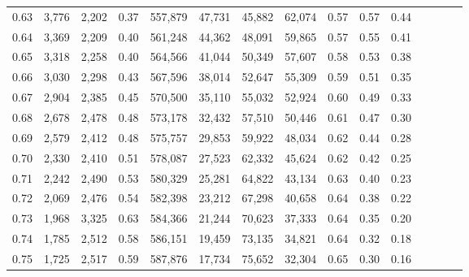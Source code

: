 \begin{tabular}{rrrcrrrrrrrrrrr}
0.63 &   3,776 &  2,202 &                                       0.37 &  557,879 &   47,731 &   45,882 &   62,074 &  0.57 &  0.57 &                         0.44 \\
0.64 &   3,369 &  2,209 &                                       0.40 &  561,248 &   44,362 &   48,091 &   59,865 &  0.57 &  0.55 &                         0.41 \\
0.65 &   3,318 &  2,258 &                                       0.40 &  564,566 &   41,044 &   50,349 &   57,607 &  0.58 &  0.53 &                         0.38 \\
0.66 &   3,030 &  2,298 &                                       0.43 &  567,596 &   38,014 &   52,647 &   55,309 &  0.59 &  0.51 &                         0.35 \\
0.67 &   2,904 &  2,385 &                                       0.45 &  570,500 &   35,110 &   55,032 &   52,924 &  0.60 &  0.49 &                         0.33 \\
0.68 &   2,678 &  2,478 &                                       0.48 &  573,178 &   32,432 &   57,510 &   50,446 &  0.61 &  0.47 &                         0.30 \\
0.69 &   2,579 &  2,412 &                                       0.48 &  575,757 &   29,853 &   59,922 &   48,034 &  0.62 &  0.44 &                         0.28 \\
0.70 &   2,330 &  2,410 &                                       0.51 &  578,087 &   27,523 &   62,332 &   45,624 &  0.62 &  0.42 &                         0.25 \\
0.71 &   2,242 &  2,490 &                                       0.53 &  580,329 &   25,281 &   64,822 &   43,134 &  0.63 &  0.40 &                         0.23 \\
0.72 &   2,069 &  2,476 &                                       0.54 &  582,398 &   23,212 &   67,298 &   40,658 &  0.64 &  0.38 &                         0.22 \\
0.73 &   1,968 &  3,325 &                                       0.63 &  584,366 &   21,244 &   70,623 &   37,333 &  0.64 &  0.35 &                         0.20 \\
0.74 &   1,785 &  2,512 &                                       0.58 &  586,151 &   19,459 &   73,135 &   34,821 &  0.64 &  0.32 &                         0.18 \\
0.75 &   1,725 &  2,517 &                                       0.59 &  587,876 &   17,734 &   75,652 &   32,304 &  0.65 &  0.30 &                         0.16 \\

\end{tabular}
